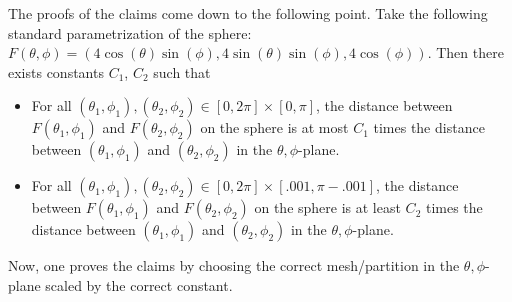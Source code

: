 \documentclass[11pt]{article}
\theoremstyle{definition}
\begin{document}
The proofs of the claims come down to the following point.  Take the following standard parametrization of the sphere: $F(\theta, \phi) = (4\cos(\theta)\sin(\phi), 4\sin(\theta)\sin(\phi), 4\cos(\phi))$.  Then there exists constants $C_1$, $C_2$ such that
\begin{itemize}
\item For all $(\theta_1, \phi_1), (\theta_2,\phi_2) \in [0, 2\pi]\times[0, \pi]$, the distance between $F(\theta_1, \phi_1)$ and $F(\theta_2,\phi_2)$ on the sphere is at most $C_1$ times the distance between $(\theta_1, \phi_1)$ and $(\theta_2,\phi_2)$ in the $\theta, \phi$-plane.
\item For all $(\theta_1, \phi_1), (\theta_2,\phi_2) \in [0, 2\pi]\times[.001, \pi-.001]$, the distance between $F(\theta_1, \phi_1)$ and $F(\theta_2,\phi_2)$ on the sphere is at least $C_2$ times the distance between $(\theta_1, \phi_1)$ and $(\theta_2,\phi_2)$ in the $\theta, \phi$-plane.
\end{itemize}
Now, one proves the claims by choosing the correct mesh/partition in the $\theta, \phi$-plane scaled by the correct constant.
\end{document}
